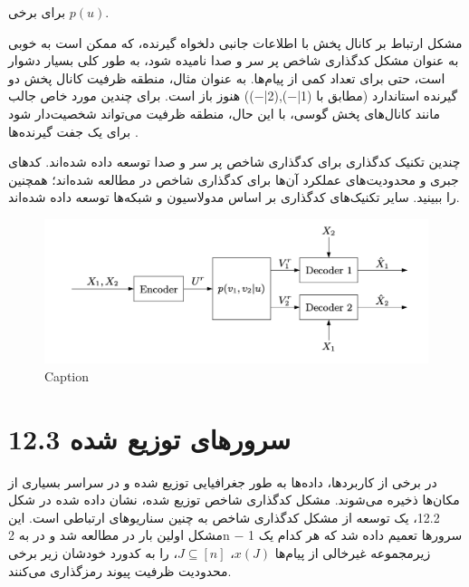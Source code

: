 برای برخی \(p(u)\).

مشکل ارتباط بر کانال پخش با اطلاعات جانبی دلخواه گیرنده، که ممکن است به خوبی به عنوان مشکل کدگذاری شاخص پر سر و صدا نامیده شود، به طور کلی بسیار دشوار است، حتی برای تعداد کمی از پیام‌ها. به عنوان مثال، منطقه ظرفیت کانال پخش دو گیرنده استاندارد \lr{[48]} (مطابق با (1|−),(2|−)) هنوز باز است. برای چندین مورد خاص جالب مانند کانال‌های پخش گوسی، با این حال، منطقه ظرفیت می‌تواند شخصیت‌دار شود برای یک جفت گیرنده‌ها \lr{[163, 137, 16]}.

چندین تکنیک کدگذاری برای کدگذاری شاخص پر سر و صدا توسعه داده شده‌اند. کدهای جبری و محدودیت‌های عملکرد آن‌ها برای کدگذاری شاخص در \lr{[52]} مطالعه شده‌اند؛ همچنین \lr{[32]} را ببینید. سایر تکنیک‌های کدگذاری بر اساس مدولاسیون \lr{[112]} و شبکه‌ها \lr{[113, 79]} توسعه داده شده‌اند.
\begin{figure}
    \centering
    \includegraphics{figs/chapter8/12.1.png}
    \caption{Caption}
    \label{fig:my_label}
\end{figure}
\section{12.3 سرورهای توزیع شده}

در برخی از کاربردها، داده‌ها به طور جغرافیایی توزیع شده و در سراسر بسیاری از مکان‌ها ذخیره می‌شوند. مشکل کدگذاری شاخص توزیع شده، نشان داده شده در شکل 12.2، یک توسعه از مشکل کدگذاری شاخص به چنین سناریوهای ارتباطی است. این مشکل اولین بار در \lr{[116]} مطالعه شد و در \lr{[124]} به 2n − 1 سرورها تعمیم داده شد که هر کدام یک زیرمجموعه غیرخالی از پیام‌ها \(x(J)\)، \(J \subseteq [n]\)، را به کدورد خودشان زیر برخی محدودیت ظرفیت پیوند رمزگذاری می‌کنند.


